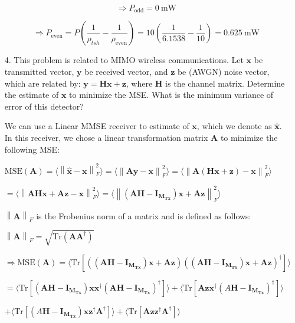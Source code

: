 \documentclass[fleqn]{article}
\newcommand{\norm}[1]{\left \lVert #1 \right \rVert}
\begin{document}
\begin{enumerate}
		\begin{equation*}
			\Rightarrow P_{\text{odd}} = 0\ \text{mW}
		\end{equation*}
		
		\begin{equation*}
			\Rightarrow P_{\text{even}} = P\left(\frac{1}{\rho_{tsh}} - \frac{1}{\rho_{\text{even}}}\right) = 10\left(\frac{1}{6.1538} - \frac{1}{10}\right) = 0.625\ \text{mW}
		\end{equation*}		
		
		\item[4.] This problem is related to MIMO wireless communications. Let $\mathbf{x}$ be transmitted vector, $\mathbf{y}$ be received vector, and $\mathbf{z}$ be (AWGN) noise vector, which are related by: $\mathbf{y}=\mathbf{Hx} + \mathbf{z}$, where $\mathbf{H}$ is the channel matrix. Determine the estimate of $\mathbf{x}$ to minimize the MSE. What is the minimum variance of error of this detector?
		
		We can use a Linear MMSE receiver to estimate of $\mathbf{x}$, which we denote as $\mathbf{\hat{x}}$. In this receiver, we chose a linear transformation matrix $\mathbf{A}$ to minimize the following MSE:
		
		$\text{MSE}(\mathbf{A}) = \langle \norm{\mathbf{\hat{x}} - \mathbf{x}}^2_F \rangle = \langle \norm{\mathbf{Ay} - \mathbf{x}}^2_F \rangle = \langle \norm{\mathbf{A}(\mathbf{Hx} + \mathbf{z}) - \mathbf{x}}^2_F \rangle$
		
		$ = \langle \norm{\mathbf{AHx} + \mathbf{Az} - \mathbf{x}}^2_F \rangle = \langle \norm{(\mathbf{AH} - \mathbf{I_{M_{Tx}}})\mathbf{x} + \mathbf{Az}}^2_F \rangle$
		
		$\norm{\mathbf{A}}_F$ is the Frobenius norm of a matrix and is defined as follows:
		
		$\norm{\mathbf{A}}_F = \sqrt{\text{Tr}(\mathbf{AA^{\dagger}})}$
		
		$\Rightarrow \text{MSE}(\mathbf{A}) = \langle \text{Tr}[((\mathbf{AH} - \mathbf{I_{M_{Tx}}})\mathbf{x} + \mathbf{Az})((\mathbf{AH} - \mathbf{I_{M_{Tx}}})\mathbf{x} + \mathbf{Az})^{\dagger}]\rangle$
		
		$ = \langle \text{Tr}[(\mathbf{AH} - \mathbf{I_{M_{Tx}}})\mathbf{xx^{\dagger}}(\mathbf{AH} - \mathbf{I_{M_{Tx}}})^{\dagger}] \rangle + \langle \text{Tr}[\mathbf{Azx^{\dagger}}(A\mathbf{H} - \mathbf{I_{M_{Tx}}})^{\dagger}] \rangle$
		
		$ + \langle \text{Tr}[(A\mathbf{H} - \mathbf{I_{M_{Tx}}})\mathbf{xz^{\dagger}A^{\dagger}}] \rangle + \langle \text{Tr}[\mathbf{Azz^{\dagger}A^{\dagger}}] \rangle$
		

\end{enumerate}
\end{document}
